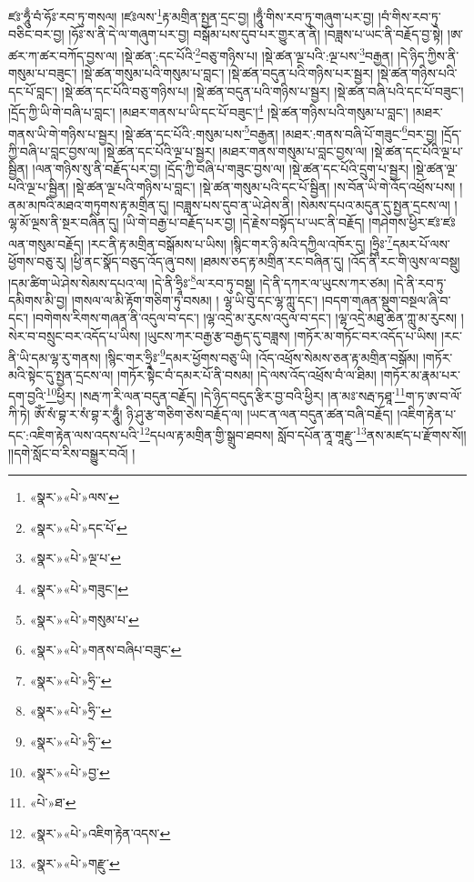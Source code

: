 ཛཿ་ཧཱུྃ་བཾ་ཧོཿ་རབ་ཏུ་གསལ། །ཛཿལས་\footnote{«སྣར་»«པེ་»ལས་}རྟ་མགྲིན་སྤྱན་དྲང་བྱ། །ཧཱུྃ་གིས་རབ་ཏུ་གཞུག་པར་བྱ། །བཾ་གིས་རབ་ཏུ་བཅིང་བར་བྱ། །ཧོཿ་ས་ནི་དེ་ལ་གཞུག་པར་བྱ། བསྒོམ་པས་དུབ་པར་གྱུར་ན་ནི། །བཟླས་པ་ཡང་ནི་བརྗོད་བྱ་སྟེ། །ཨ་ཚར་ཀ་ཚར་བཀོད་བྱས་ལ། །སྡེ་ཚན་:དང་པོའི་\footnote{«སྣར་»«པེ་»དང་པོ་}བཅུ་གཉིས་པ། །སྡེ་ཚན་ལྔ་པའི་:ལྔ་པས་\footnote{«སྣར་»«པེ་»ལྔ་པ་}བརྒྱན། །དེ་ཉིད་ཀྱིས་ནི་གསུམ་པ་བཟུང་། །སྡེ་ཚན་གསུམ་པའི་གསུམ་པ་བླང་། །སྡེ་ཚན་བདུན་པའི་གཉིས་པར་སྦྱར། །སྡེ་ཚན་གཉིས་པའི་དང་པོ་བླང་། །སྡེ་ཚན་དང་པོའི་བཅུ་གཉིས་པ། །སྡེ་ཚན་བདུན་པའི་གཉིས་པ་སྦྱར། །སྡེ་ཚན་བཞི་པའི་དང་པོ་བཟུང་། །དྲོད་ཀྱི་ཡི་གེ་བཞི་པ་བླང་། །མཐར་གནས་པ་ཡི་དང་པོ་བཟུང་།\footnote{«སྣར་»«པེ་»གཟུང་།} །སྡེ་ཚན་གཉིས་པའི་གསུམ་པ་བླང་། །མཐར་གནས་ཡི་གེ་གཉིས་པ་སྦྱར། །སྡེ་ཚན་དང་པོའི་:གསུམ་པས་\footnote{«སྣར་»«པེ་»གསུམ་པ་}བརྒྱན། །མཐར་:གནས་བཞི་པོ་གཟུང་\footnote{«སྣར་»«པེ་»གནས་བཞིཔ་བཟུང་}བར་བྱ། །དྲོད་ཀྱི་བཞི་པ་བླང་བྱས་ལ། །སྡེ་ཚན་དང་པོའི་ལྔ་པ་སྦྱར། །མཐར་གནས་གསུམ་པ་བླང་བྱས་ལ། །སྡེ་ཚན་དང་པོའི་ལྔ་པ་སྦྱིན། །ལན་གཉིས་སུ་ནི་བརྗོད་པར་བྱ། །དྲོད་ཀྱི་བཞི་པ་གཟུང་བྱས་ལ། །སྡེ་ཚན་དང་པོའི་དྲུག་པ་སྦྱར། །སྡེ་ཚན་ལྔ་པའི་ལྔ་པ་སྦྱིན། །སྡེ་ཚན་ལྔ་པའི་གཉིས་པ་བླང་། །སྡེ་ཚན་གསུམ་པའི་དང་པོ་སྦྱིན། །ས་བོན་ཡི་གེ་འོད་འཕྲོས་པས། །ནམ་མཁའི་མཐའ་གཏུགས་རྟ་མགྲིན་དུ། །བཟླས་པས་དུབ་ན་ཡེ་ཤེས་ནི། །སེམས་དཔའ་མདུན་དུ་སྤྱན་དྲངས་ལ། །ལྷ་མོ་ལྔས་ནི་སྔར་བཞིན་དུ། །ཡི་གེ་བརྒྱ་པ་བརྗོད་པར་བྱ། །དེ་རྗེས་བསྟོད་པ་ཡང་ནི་བརྗོད། །གཤེགས་ཕྱིར་ཛཿ་ཛཿལན་གསུམ་བརྗོད། །རང་ནི་རྟ་མགྲིན་བསྒོམས་པ་ཡིས། །སྙིང་གར་ཉི་མའི་དཀྱིལ་འཁོར་དུ། །ཧྲཱིཿ་\footnote{«སྣར་»«པེ་»ཧྲི་་}དམར་པོ་ལས་ཕྱོགས་བཅུ་རུ། །ཕྱི་ནང་སྣོད་བཅུད་འོད་ཞུ་བས། །ཐམས་ཅད་རྟ་མགྲིན་རང་བཞིན་དུ། །འོད་ནི་རང་གི་ལུས་ལ་བསྡུ། །དམ་ཚིག་ཡེ་ཤེས་སེམས་དཔའ་ལ། །དེ་ནི་ཧྲཱིཿ་\footnote{«སྣར་»«པེ་»ཧྲི་་}ལ་རབ་ཏུ་བསྡུ། །དེ་ནི་དཀར་ལ་ཡུངས་ཀར་ཙམ། །དེ་ནི་རབ་ཏུ་དམིགས་མི་བྱ། །གསལ་ལ་མི་རྟོག་གཅིག་ཏུ་བསམ། །
ལྷ་ཡི་བུ་དང་ལྷ་ཀླུ་དང་། །བདག་གཞན་སྡུག་བསྔལ་ཞི་བ་དང་། །བགེགས་རིགས་གཞན་ནི་འདུལ་བ་དང་། །ལྷ་འདྲེ་མ་རུངས་འདུལ་བ་དང་། །ལྷ་འདྲེ་མཐུ་ཆེན་ཀླུ་མ་རུངས། །སེར་བ་བསྲུང་བར་འདོད་པ་ཡིས། །ཡུངས་ཀར་བརྒྱ་རྩ་བརྒྱད་དུ་བཟླས། །གཏོར་མ་གཏོང་བར་འདོད་པ་ཡིས། །རང་ནི་ཡི་དམ་ལྷ་རུ་གནས། །སྙིང་གར་ཧྲཱིཿ་\footnote{«སྣར་»«པེ་»ཧྲི་་}དམར་ཕྱོགས་བཅུ་ཡི། །འོད་འཕྲོས་སེམས་ཅན་རྟ་མགྲིན་བསྒོམ། །གཏོར་མའི་སྟེང་དུ་སྤྱན་དྲངས་ལ། །གཏོར་སྟེང་བཾ་དམར་པོ་ནི་བསམ། །དེ་ལས་འོད་འཕྲོས་བཾ་ལ་ཐིམ། །གཏོར་མ་རྣམ་པར་དག་བྱའི་\footnote{«སྣར་»«པེ་»བྱ་}ཕྱིར། །སརྦ་ཀ་རི་ལན་བདུན་བརྗོད། །དེ་ཉིད་བདུད་རྩིར་བྱ་བའི་ཕྱིར། །ན་མཿ་སརྦ་ཏཐཱ་\footnote{«པེ་»ཐ་}ག་ཏ་ཨ་བ་ལོ་ཀི་ཏེ། ཨོཾ་སཾ་བྷ་ར་སཾ་བྷ་ར་ཧཱུྃ། ཉི་ཤུ་རྩ་གཅིག་ཅེས་བརྗོད་ལ། །ཡང་ན་ལན་བདུན་ཚན་བཞི་བརྗོད། །འཇིག་རྟེན་པ་དང་:འཇིག་རྟེན་ལས་འདས་པའི་\footnote{«སྣར་»«པེ་»འཇིག་རྟེན་འདས་}དཔལ་རྟ་མགྲིན་གྱི་སྒྲུབ་ཐབས། སློབ་དཔོན་ནཱ་གཱརྫུ་\footnote{«སྣར་»«པེ་»གརྫུ་}ནས་མཛད་པ་རྫོགས་སོ།། །།དགེ་སློང་བ་རིས་བསྒྱུར་བའོ། ། 